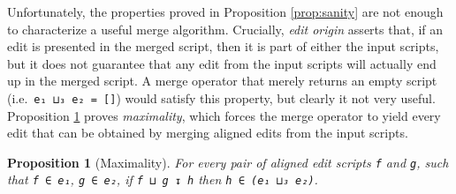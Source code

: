 \documentclass{sigplanconf}
\theoremstyle{plain}
\newtheorem{prop}{Proposition}
\begin{document}

 

Unfortunately, the properties proved in Proposition \ref{prop:sanity}
are not enough to characterize a useful merge algorithm.
%
Crucially, \emph{edit origin} asserts that, if an edit is presented in
the merged script, then it is part of either the input scripts, but it
does not guarantee that any edit from the input scripts will actually
end up in the merged script.
%
A merge operator that merely returns an empty script (i.e.\ \texttt{e₁ ⊔₃ e₂
  = []}) would satisfy this property, but clearly it not very useful.
%
Proposition \ref{prop:maximality} proves \emph{maximality}, which
forces the merge operator to yield every edit that can be obtained
by merging aligned edits from the input scripts.

\begin{prop}[Maximality]
  \label{prop:maximality}
  For every pair of aligned edit scripts \texttt{f} and \texttt{g},
  such that \texttt{f ∈ e₁}, \texttt{g ∈ e₂}, if \texttt{f ⊔ g ↧ h}
  then \texttt{h ∈ (e₁ ⊔₃ e₂)}.
\end{prop}
\end{document}
